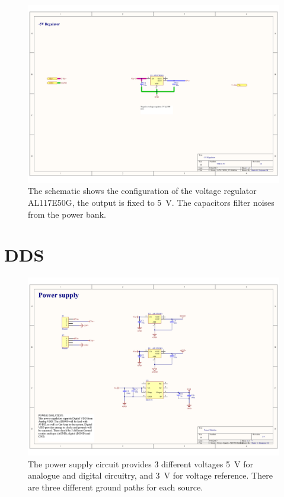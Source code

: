 \begin{landscape}
\begin{figure}[!htpb]
	\centering
	\includegraphics[width=0.95\paperwidth,keepaspectratio]{power_supply_5}
	\caption[Schematic of the \SI{5}{\volt} voltage regulator]{The schematic shows the configuration of the voltage regulator AL117E50G, the output is fixed to \SI{5}{\volt}. The capacitors filter noises from the power bank.}
	\label{fig:schematic PS 5}
\end{figure}
\end{landscape}


\section*{DDS}
\label{Appendix: DDS PS}
\begin{figure}[!htpb]
	\centering
	\includegraphics[width=0.9\paperwidth,keepaspectratio,angle=90]{DDS_power_supply}
	\caption[Schematic of the Power supply of the DDS]{The power supply circuit provides 3 different voltages \SI{5}{\volt} for analogue and digital circuitry, and \SI{3}{\volt} for voltage reference. There are three different ground paths for each source. }
	\label{fig:DDS PS}
\end{figure}


